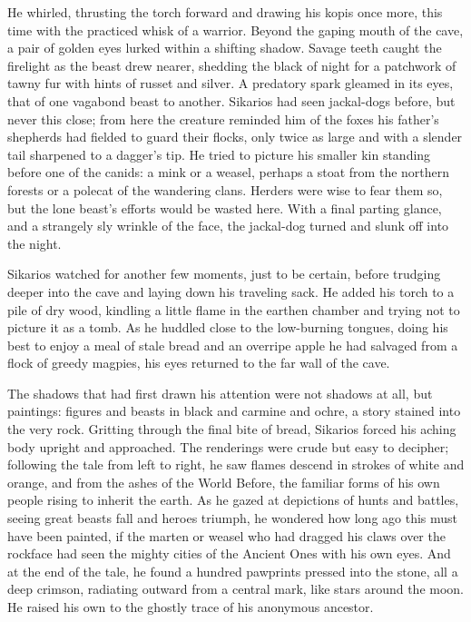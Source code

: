 He whirled, thrusting the torch forward and drawing his kopis once more, this time with the practiced whisk of a warrior. Beyond the gaping mouth of the cave, a pair of golden eyes lurked within a shifting shadow. Savage teeth caught the firelight as the beast drew nearer, shedding the black of night for a patchwork of tawny fur with hints of russet and silver. A predatory spark gleamed in its eyes, that of one vagabond beast to another. Sikarios had seen jackal-dogs before, but never this close; from here the creature reminded him of the foxes his father's shepherds had fielded to guard their flocks, only twice as large and with a slender tail sharpened to a dagger's tip. He tried to picture his smaller kin standing before one of the canids: a mink or a weasel, perhaps a stoat from the northern forests or a polecat of the wandering clans. Herders were wise to fear them so, but the lone beast's efforts would be wasted here. With a final parting glance, and a strangely sly wrinkle of the face, the jackal-dog turned and slunk off into the night.

Sikarios watched for another few moments, just to be certain, before trudging deeper into the cave and laying down his traveling sack. He added his torch to a pile of dry wood, kindling a little flame in the earthen chamber and trying not to picture it as a tomb. As he huddled close to the low-burning tongues, doing his best to enjoy a meal of stale bread and an overripe apple he had salvaged from a flock of greedy magpies, his eyes returned to the far wall of the cave.

The shadows that had first drawn his attention were not shadows at all, but paintings: figures and beasts in black and carmine and ochre, a story stained into the very rock. Gritting through the final bite of bread, Sikarios forced his aching body upright and approached. The renderings were crude but easy to decipher; following the tale from left to right, he saw flames descend in strokes of white and orange, and from the ashes of the World Before, the familiar forms of his own people rising to inherit the earth. As he gazed at depictions of hunts and battles, seeing great beasts fall and heroes triumph, he wondered how long ago this must have been painted, if the marten or weasel who had dragged his claws over the rockface had seen the mighty cities of the Ancient Ones with his own eyes. And at the end of the tale, he found a hundred pawprints pressed into the stone, all a deep crimson, radiating outward from a central mark, like stars around the moon. He raised his own to the ghostly trace of his anonymous ancestor.

